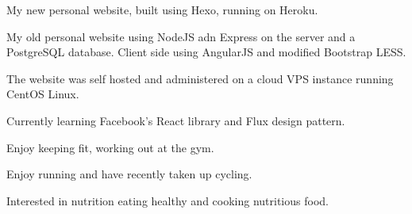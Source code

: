 \documentclass[a4paper]{deedy-resume} %
\begin{document}
\begin{minipage}[t]{0.66\textwidth}
\begin{tightitemize}
\item My new personal website, built using Hexo, running on Heroku.
\end{tightitemize}
\begin{tightitemize}
\item My old personal website using NodeJS adn Express on the server and a PostgreSQL database. Client side using AngularJS and modified Bootstrap LESS.
\item The website was self hosted and administered on a cloud VPS instance running CentOS Linux.
\item Currently learning Facebook's React library and Flux design pattern.
\end{tightitemize}
\sectionspace %


\descript{}
\begin{tightitemize}
\item Enjoy keeping fit, working out at the gym.
\item Enjoy running and have recently taken up cycling.
\item Interested in nutrition eating healthy and cooking nutritious food.
\end{tightitemize}
\sectionspace %


\end{minipage} %

\end{document}

